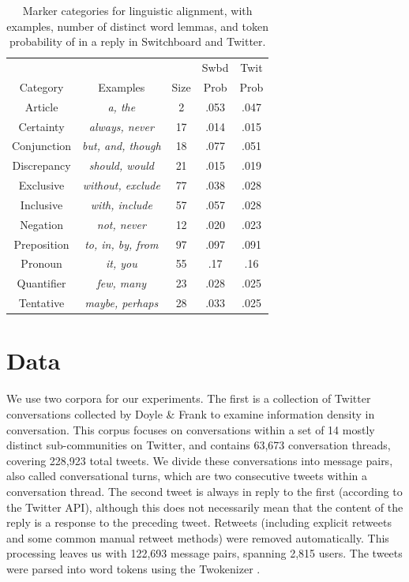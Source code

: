 \documentclass[11pt]{article}
\begin{document}
\begin{table}
\centering
\small
\begin{tabular}{|c|c|c|c|c|} \hline
& & & Swbd & Twit \\
Category & Examples & Size & Prob & Prob\\ \hline
Article & \textit{a, the} & 2 & .053 & .047\\
Certainty  & \textit{always, never} & 17 & .014 & .015\\
Conjunction  & \textit{but, and, though} & 18 & .077 & .051\\
Discrepancy  & \textit{should, would} & 21 & .015 & .019\\
Exclusive  & \textit{without, exclude} & 77 & .038 & .028\\
Inclusive  & \textit{with, include} & 57 & .057 & .028\\
Negation  & \textit{not, never} & 12 & .020 & .023\\
Preposition  & \textit{to, in, by, from} & 97 & .097 & .091\\
Pronoun   & \textit{it, you} & 55 & .17 & .16\\
Quantifier  & \textit{few, many} & 23 & .028 & .025\\
Tentative & \textit{maybe, perhaps} & 28 & .033 & .025\\
\hline\end{tabular}
\caption{Marker categories for linguistic alignment, with examples, number of distinct word lemmas, and token probability of in a reply in Switchboard and Twitter.}\label{table:liwc}
\end{table}

\section{Data}

We use two corpora for our experiments. The first is a collection of Twitter conversations collected by Doyle \& Frank  to examine information density in conversation. This corpus focuses on conversations within a set of 14 mostly distinct sub-communities on Twitter, and contains 63,673 conversation threads, covering 228,923 total tweets.  We divide these conversations into message pairs, also called conversational turns, which are two consecutive tweets within a conversation thread.  The second tweet is always in reply to the first (according to the Twitter API), although this does not necessarily mean that the content of the reply is a response to the preceding tweet. Retweets (including explicit retweets and some common manual retweet methods) were removed automatically. This processing leaves us with 122,693 message pairs, spanning 2,815 users.  The tweets were parsed into word tokens using the Twokenizer \cite{OwoputiEtAl2013}.
\end{document}
